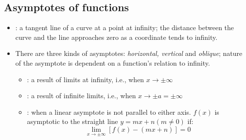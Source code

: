 \begin{itemize}
  \subsection{Asymptotes of functions}
  \begin{itemize}
    \item  {}: a tangent line of a curve at a point at infinity; the distance between the curve and the line approaches zero as a coordinate tends to infinity.
    \item There are three kinds of asymptotes: \textit{horizontal, vertical} and \textit{oblique}; nature of the asymptote is dependent on a function's relation to infinity.
      \begin{itemize}
        \item {}: a result of limits at infinity, i.e., when \(x\to \pm \infty\)
        \item {}: a result of infinite limits, i.e., when \(x\to \pm a = \pm \infty\)
        \item {}: when a linear asymptote is not parallel to either axis. \(f(x)\) is asymptotic to the straight line \(y=mx+n (m\neq 0)\) if:
        \[%
        \lim_{x \to \pm\infty} \left[
          f(x) - \left(
            mx + n
          \right) 
        \right] = 0
        \]%
      \end{itemize}
    
  \end{itemize}

\end{itemize}






